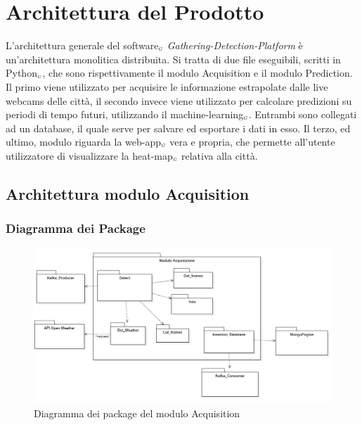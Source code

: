 \chapter{Architettura del Prodotto}\label{ArchitetturaDelProdotto}
L'architettura generale del software$_{\scaleto{G}{3pt}}$ \textit{Gathering-Detection-Platform} è un'architettura monolitica distribuita.
Si tratta di due file eseguibili, scritti in Python$_{\scaleto{G}{3pt}}$, che sono rispettivamente il modulo Acquisition e il modulo Prediction.
Il primo viene utilizzato per acquisire le informazione estrapolate dalle live webcams delle città, il secondo invece viene utilizzato per calcolare predizioni su periodi di tempo futuri, utilizzando il machine-learning$_{\scaleto{G}{3pt}}$.
Entrambi sono collegati ad un database, il quale serve per salvare ed esportare i dati in esso.
Il terzo, ed ultimo, modulo riguarda la web-app$_{\scaleto{G}{3pt}}$ vera e propria, che permette all'utente utilizzatore di visualizzare la heat-map$_{\scaleto{G}{3pt}}$ relativa alla città.


\section{Architettura modulo Acquisition}
\subsection{Diagramma dei Package}
\begin{figure}[!h]
  \begin{center}
    \includegraphics[width=1\linewidth]{../immagini/diag_PB/diag_pack_acqui.png}
    \caption{Diagramma dei package del modulo Acquisition}
  \end{center}
\end{figure}

